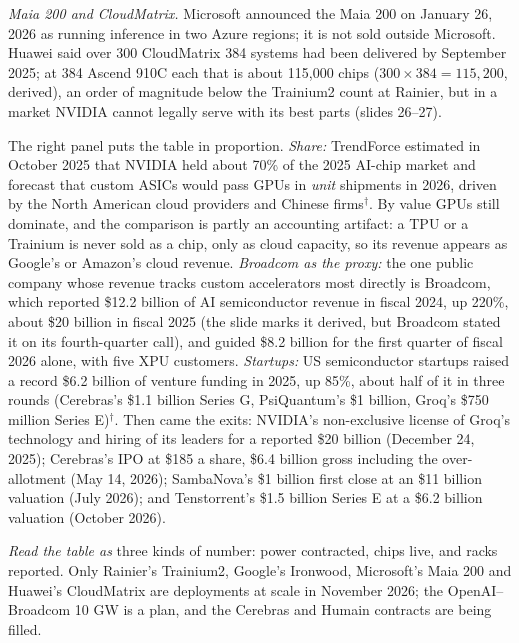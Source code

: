 \documentclass[11pt,letterpaper]{article}
\begin{document}
\emph{Maia 200 and CloudMatrix.} Microsoft announced the Maia 200 on January 26, 2026 as running inference in two Azure regions; it is not sold outside Microsoft. Huawei said over 300 CloudMatrix 384 systems had been delivered by September 2025; at 384 Ascend 910C each that is about 115{,}000 chips ($300\times384 = 115{,}200$, derived), an order of magnitude below the Trainium2 count at Rainier, but in a market NVIDIA cannot legally serve with its best parts (slides 26--27).

The right panel puts the table in proportion. \emph{Share:} TrendForce estimated in October 2025 that NVIDIA held about 70\% of the 2025 AI-chip market and forecast that custom ASICs would pass GPUs in \emph{unit} shipments in 2026, driven by the North American cloud providers and Chinese firms$^\dagger$. By value GPUs still dominate, and the comparison is partly an accounting artifact: a TPU or a Trainium is never sold as a chip, only as cloud capacity, so its revenue appears as Google's or Amazon's cloud revenue. \emph{Broadcom as the proxy:} the one public company whose revenue tracks custom accelerators most directly is Broadcom, which reported \$12.2 billion of AI semiconductor revenue in fiscal 2024, up 220\%, about \$20 billion in fiscal 2025 (the slide marks it derived, but Broadcom stated it on its fourth-quarter call), and guided \$8.2 billion for the first quarter of fiscal 2026 alone, with five XPU customers. \emph{Startups:} US semiconductor startups raised a record \$6.2 billion of venture funding in 2025, up 85\%, about half of it in three rounds (Cerebras's \$1.1 billion Series G, PsiQuantum's \$1 billion, Groq's \$750 million Series E)$^\dagger$. Then came the exits: NVIDIA's non-exclusive license of Groq's technology and hiring of its leaders for a reported \$20 billion (December 24, 2025); Cerebras's IPO at \$185 a share, \$6.4 billion gross including the over-allotment (May 14, 2026); SambaNova's \$1 billion first close at an \$11 billion valuation (July 2026); and Tenstorrent's \$1.5 billion Series E at a \$6.2 billion valuation (October 2026).

\emph{Read the table as} three kinds of number: power contracted, chips live, and racks reported. Only Rainier's Trainium2, Google's Ironwood, Microsoft's Maia 200 and Huawei's CloudMatrix are deployments at scale in November 2026; the OpenAI--Broadcom 10 GW is a plan, and the Cerebras and Humain contracts are being filled.
\end{document}
